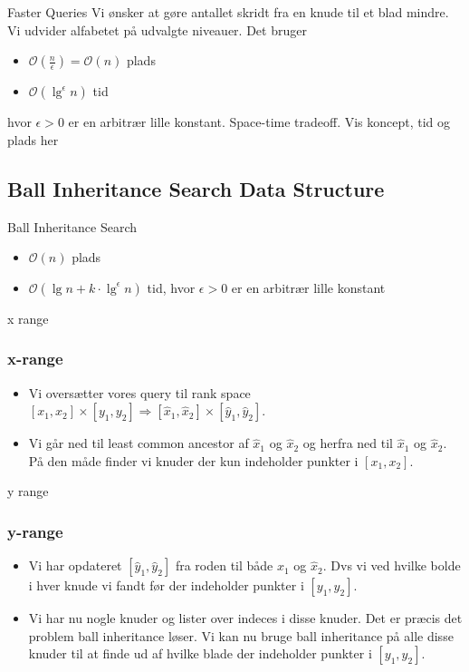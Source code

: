 \documentclass[pdf]{beamer}
\begin{document}
\begin{frame}{Faster Queries}
  Vi ønsker at gøre antallet skridt fra en knude til et blad mindre. Vi udvider alfabetet på udvalgte niveauer.
  Det bruger
  \begin{itemize}
    \item $\mathcal{O}(\frac{n}{\epsilon}) = \mathcal{O}(n)$ plads
    \item $\mathcal{O}(\lg^\epsilon n)$ tid
  \end{itemize}
  hvor $\epsilon > 0$ er en arbitrær lille konstant. Space-time tradeoff.
  Vis koncept, tid og plads her
\end{frame}

\subsection{Ball Inheritance Search Data Structure}
\begin{frame}{Ball Inheritance Search}
  \begin{itemize}
    \item $\mathcal{O}(n)$ plads
    \item $\mathcal{O}(\lg n + k\cdot\lg^\epsilon n)$ tid, hvor $\epsilon > 0$ er en arbitrær lille konstant
  \end{itemize}
\end{frame}

\begin{frame}{x range}
  \frametitle{x-range}
  \begin{itemize}
    \item Vi oversætter vores query til rank space $[x_1, x_2] \times [y_1, y_2] \Rightarrow [\hat{x}_1, \hat{x}_2] \times [\hat{y}_1, \hat{y}_2]$.
      \pause

    \item Vi går ned til least common ancestor af $\hat{x}_1$ og $\hat{x}_2$ og herfra ned til $\hat{x}_1$ og $\hat{x}_2$. På den måde finder vi knuder der kun indeholder punkter i $[x_1, x_2]$.
  \end{itemize}
\end{frame}

\begin{frame}{y range}
  \frametitle{y-range}
  \begin{itemize}
    \item Vi har opdateret $[\hat{y}_1, \hat{y}_2]$ fra roden til både $\hat{x}_1$ og $\hat{x}_2$. Dvs vi ved hvilke bolde i hver knude vi fandt før der indeholder punkter i $[y_1, y_2]$.
      \pause
    \item  Vi har nu nogle knuder og lister over indeces i disse knuder. Det er præcis det problem ball inheritance løser. Vi kan nu bruge ball inheritance på alle disse knuder til at finde ud af hvilke blade der indeholder punkter i $[y_1, y_2]$.
  \end{itemize}
\end{frame}
\end{document}

